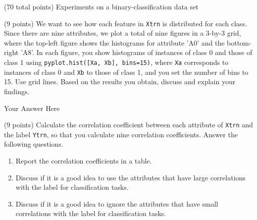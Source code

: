 \documentclass[12pt]{article}
\begin{document}
\clearpage
%
%
\newcommand{\qOneTitle}{Experiments on a binary-classification data set}
%

  \begin{question}{(70 total points) \qOneTitle}




%
%
%
\medskip

\begin{subquestion}{(9 points)
    We want to see how each feature in {\tt Xtrn} is distributed for each class.
    Since there are nine attributes, we plot a total of nine figures in a 3-by-3 grid, where the top-left figure shows the histograms for attribute 'A0' and the bottom-right 'A8'.
    In each figure, you show histograms of instances of class 0 and those of class 1 using {\tt pyplot.hist([Xa, Xb], bins=15)}, where {\tt Xa} corresponds to instances of class 0 and {\tt Xb} to those of class 1, and you set the number of bins to 15. Use grid lines.
    Based on the results you obtain, discuss and explain your findings.
  } \label{Q1.1}


  \begin{answerbox}{0.78\textheight}
    Your Answer Here
  \end{answerbox}
  


\end{subquestion}

\begin{subquestion}{(9 points)
    Calculate the correlation coefficient between each attribute of {\tt Xtrn} and the label {\tt Ytrn}, so that you calculate nine correlation coefficients. Answer the following questions.
  }
  \begin{enumerate}\NARROWITEM
  \item Report the correlation coefficients in a table.
  \item Discuss if it is a good idea to use the attributes that have large
    correlations with the label for classification tasks.
  \item Discuss if it is a good idea to ignore the attributes that have small correlations with the label for classification tasks.
  \end{enumerate}



\end{subquestion}
\end{question}
\end{document}
